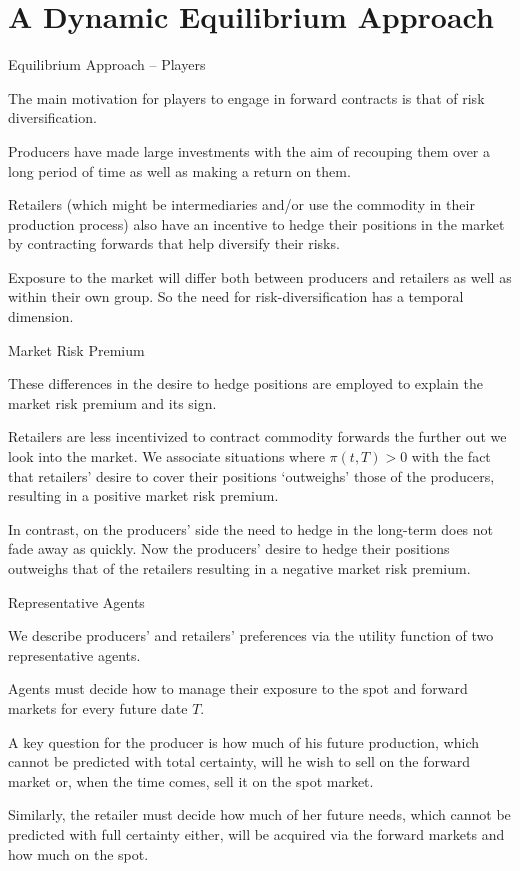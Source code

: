 \section{A Dynamic Equilibrium Approach}

{Equilibrium Approach -- Players}

\item<1->
The main
motivation for players to engage in forward contracts is that of
risk diversification.
\item<2->
Producers have made large investments with the
aim of recouping them over a long period of time as well as making a
return on them.
\item<3->
Retailers (which might be intermediaries and/or use the commodity in
their production process) also have an incentive to hedge their
positions in the market by contracting forwards that help diversify
their risks.
\item<4->
Exposure to the market will differ both between producers and
retailers as well as within their own group.
So the need for risk-diversification has a temporal dimension.

{Market Risk Premium}

\item<1-> These differences in the
desire to hedge positions are employed to explain the market risk premium and
its sign.
\item<2-> Retailers are less incentivized to contract commodity forwards
the further out we look into the market. We associate situations where
$\pi(t,T)>0$ with the fact that retailers' desire to cover their
positions `outweighs' those of the producers, resulting in a
positive market risk premium.
\item<3-> In contrast, on the producers' side the need to hedge in the long-term
does not fade away as quickly. Now the producers' desire to hedge their positions outweighs that of the retailers resulting in a negative market risk premium.

{Representative Agents}

\item<1-> We describe producers' and retailers'
preferences via the utility function of two representative agents.
\item<2-> Agents
must decide how to manage their exposure to the spot and forward
markets for every future date $T$.
\item<3->
A key question for the producer
is how much of his future production, which cannot be predicted with
total certainty, will he wish to sell on the forward market or, when
the time comes, sell it on the spot market.
\item<4-> Similarly, the retailer
must decide how much of her future needs, which cannot be predicted
with full certainty either, will be acquired via the forward markets
and how much on the spot.

